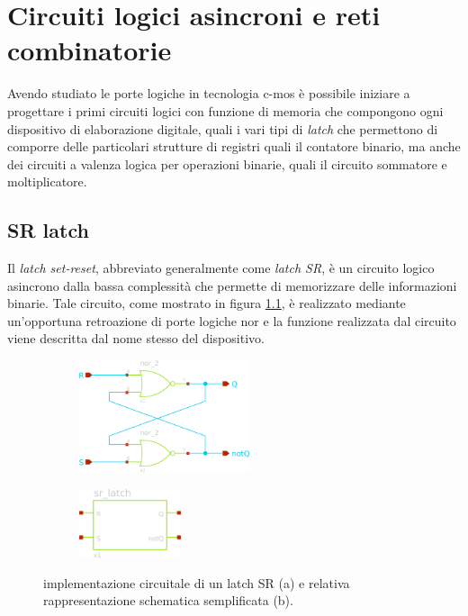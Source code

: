 \chapter{Circuiti logici asincroni e reti combinatorie}
	
	Avendo studiato le porte logiche in tecnologia c-mos è possibile iniziare a progettare i primi circuiti logici con funzione di memoria che compongono ogni dispositivo di elaborazione digitale, quali i vari tipi di \textit{latch} che permettono di comporre delle particolari strutture di registri quali il contatore binario, ma anche dei circuiti a valenza logica per operazioni binarie, quali il circuito sommatore e moltiplicatore.
	
\section{SR latch}
	Il \textit{latch set-reset}, abbreviato generalmente come \textit{latch SR}, è un circuito logico asincrono dalla bassa complessità che permette di memorizzare delle informazioni binarie. Tale circuito, come mostrato in figura \ref{fig:srl:schematico}, è realizzato mediante un'opportuna retroazione di porte logiche nor e la funzione realizzata dal circuito viene descritta dal nome stesso del dispositivo.
	
	\begin{figure}[bht]
		\centering
		\begin{subfigure}{0.48\linewidth}
			\centering
			\includegraphics[width=5cm]{Immagini/srlatch-sch} \caption{}
		\end{subfigure}
		\begin{subfigure}{0.48\linewidth}
			\centering
			\includegraphics[width=3cm]{Immagini/srlatch-simple} \caption{}
		\end{subfigure}
		\caption{implementazione circuitale di un latch SR (a) e relativa rappresentazione schematica semplificata (b).}
		\label{fig:srl:schematico}
	\end{figure}
	
